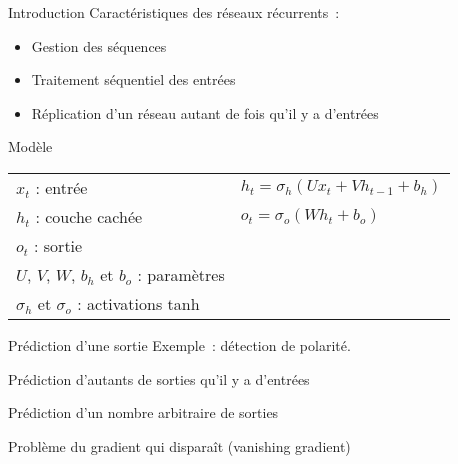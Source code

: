 \begin{frame}{Introduction}
  Caractéristiques des réseaux récurrents~:

  \begin{itemize}[<+->]
    \item Gestion des séquences
    \item Traitement séquentiel des entrées
    \item Réplication d'un réseau autant de fois qu'il y a d'entrées
  \end{itemize}
\end{frame}

\begin{frame}{Modèle}
  \begin{tabular}{ ll } 
    $x_{t}$ : entrée  & $h_{t}=\sigma_{h}(Ux_{t}+Vh_{t-1}+b_{h})$ \\
    $h_t$ : couche cachée  & $o_{t}=\sigma_{o}(Wh_{t}+b_{o})$ \\
    $o_{t}$ : sortie \\
    $U$, $V$, $W$, $b_h$ et $b_o$ : paramètres  \\
    $\sigma_{h}$ et $\sigma_o$ : activations tanh  \\
  \end{tabular}
\end{frame}

\begin{frame}{Prédiction d'une sortie}
  Exemple~: détection de polarité.

  \begin{figure}
    \centering
  \end{figure}
\end{frame}

\begin{frame}{Prédiction d'autants de sorties qu'il y a d'entrées}
\end{frame}

\begin{frame}{Prédiction d'un nombre arbitraire de sorties}
\end{frame}

\begin{frame}{Problème du gradient qui disparaît (vanishing gradient)}
\end{frame}
